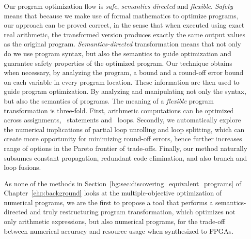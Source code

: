 Our program optimization flow is \emph{safe}, \emph{semantics-directed} and
\emph{flexible}. \emph{Safety} means that because we make use of formal
mathematics to optimize programs, our approach can be proved correct, in
the sense that when executed using exact real arithmetic, the transformed
version produces exactly the same output values as the original program.
\emph{Semantics-directed} transformation means that not only do we use
program syntax, but also the semantics to guide optimization and guarantee
safety properties of the optimized program.  Our technique obtains when
necessary, by analyzing the program, a bound and a round-off error bound on
each variable in every program location.  These information are then used
to guide program optimization.  By analyzing and manipulating not only the
syntax, but also the semantics of programs.  The meaning of a \emph{flexible}
program transformation is three-fold.  First, arithmetic computations can be
optimized across assignments, \iflit~statements and \whilelit~loops.  Secondly,
we automatically explore the numerical implications of partial loop unrolling
and loop splitting, which can create more opportunity for minimizing round-off
errors, hence further increases range of options in the Pareto frontier of
trade-offs.  Finally, our method naturally subsumes constant propagation,
redundant code elimination, and also branch and loop fusions.

As none of the methods in Section~\ref{bg:sec:discovering_equivalent_programs}
of Chapter~\ref{chp:background} looks at the multiple-objective optimization
of numerical programs, we are the first to propose a tool that performs a
semantics-directed and truly restructuring program transformation, which
optimizes not only arithmetic expressions, but also numerical programs, for the
trade-off between numerical accuracy and resource usage when synthesized to
FPGAs.


